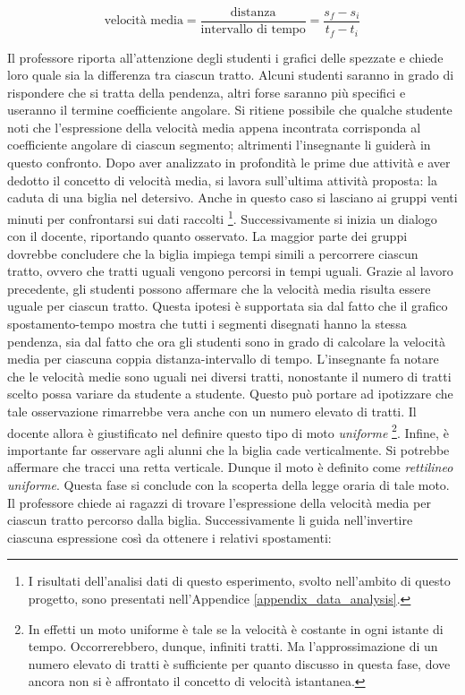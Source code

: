 \documentclass{report} \usepackage[T1]{fontenc} \usepackage[italian]{babel}
\begin{document}
\begin{equation}
\textrm{velocità media} = \frac{\textrm{distanza}}{\textrm{intervallo di tempo}} =
\frac{s_f - s_i}{t_f - t_i}
\end{equation}

Il professore riporta all’attenzione degli studenti i grafici delle spezzate e
chiede loro quale sia la differenza tra ciascun tratto. Alcuni studenti saranno
in grado di rispondere che si tratta della pendenza, altri forse saranno più
specifici e useranno il termine coefficiente angolare. Si ritiene possibile che
qualche studente noti che l’espressione della velocità media appena incontrata
corrisponda al coefficiente angolare di ciascun segmento; altrimenti
l’insegnante li guiderà in questo confronto.
Dopo aver analizzato in profondità le prime due attività e aver dedotto il
concetto di velocità media, si lavora sull’ultima attività proposta: la caduta
di una biglia nel detersivo. Anche in questo caso si lasciano ai gruppi venti minuti
per confrontarsi sui dati raccolti
\footnote{
          I risultati dell'analisi dati di questo esperimento, svolto
          nell'ambito di questo progetto, sono presentati nell'Appendice
          \ref{appendix_data_analysis}.
         }.
Successivamente si
inizia un dialogo con il docente, riportando quanto osservato. La maggior parte
dei gruppi dovrebbe concludere che la biglia impiega tempi simili a percorrere
ciascun tratto, ovvero che tratti uguali vengono percorsi in tempi uguali.
Grazie al lavoro precedente, gli studenti possono affermare che la velocità
media risulta essere uguale per ciascun tratto. Questa ipotesi è supportata sia
dal fatto che il grafico spostamento-tempo mostra che tutti i segmenti disegnati
hanno la stessa pendenza,
sia dal fatto che ora gli studenti sono in grado di calcolare la velocità
media per ciascuna coppia distanza-intervallo di tempo.
L’insegnante fa notare che le velocità medie sono uguali nei
diversi tratti, nonostante il numero di tratti scelto possa variare da studente
a studente. Questo può portare ad ipotizzare che tale osservazione rimarrebbe
vera anche con un numero elevato di tratti. Il docente allora è giustificato
nel definire questo tipo di moto \emph{uniforme}
\footnote{
          In effetti un moto uniforme è
          tale se la velocità è costante in ogni istante di tempo. Occorrerebbero,
          dunque, infiniti tratti. Ma l’approssimazione di un numero elevato di tratti è
          sufficiente per quanto discusso in questa fase, dove ancora non si è affrontato
          il concetto di velocità istantanea.
         }.
Infine, è importante far osservare agli
alunni che la biglia cade verticalmente. Si potrebbe affermare che tracci una
retta verticale. Dunque il moto è definito come \emph{rettilineo uniforme}. Questa
fase si conclude con la scoperta della legge oraria di tale moto. Il professore
chiede ai ragazzi di trovare l’espressione della velocità media per ciascun
tratto percorso dalla biglia. Successivamente li guida nell’invertire ciascuna
espressione così da ottenere i relativi spostamenti:
\end{document}

